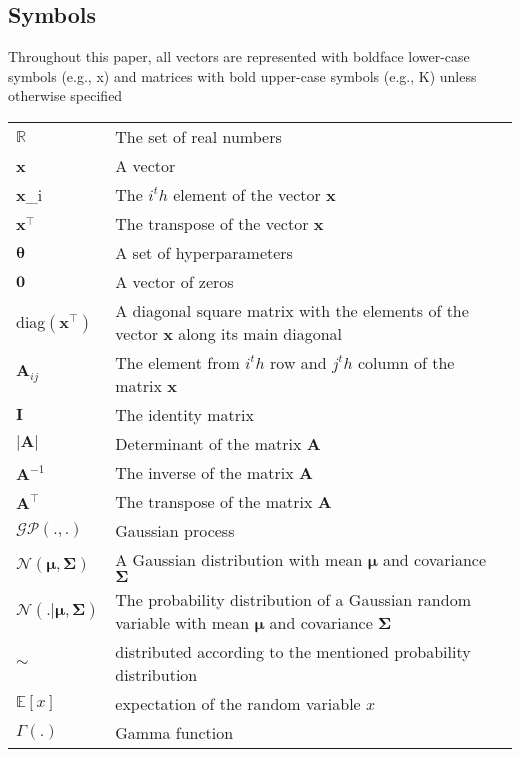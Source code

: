 \subsection{Symbols}
Throughout this paper, all vectors are represented with boldface lower-case symbols (e.g., x) and
matrices with bold upper-case symbols (e.g., K) unless otherwise specified %


\begin{table}[!htbp]
    {\renewcommand{\arraystretch}{1.5}
    \begin{tabularx}{0.99\textwidth}{ l| X }
      $\mathbb{R}$ & The set of real numbers \\
      \textbf{x} & A vector \\
      \textbf{x}_i & The $i^th$ element of the vector \textbf{x} \\
      $\textbf{x}^\top$ & The transpose of the vector \textbf{x} \\
      $\boldsymbol{\theta}$ & A set of hyperparameters \\
      $\textbf{0}$ & A vector of zeros \\
      diag$\left(\textbf{x}^\top\right)$ & A diagonal square matrix with the elements of the vector \textbf{x} along its main diagonal \\
      $\textbf{A}_{ij}$ & The element from $i^th$ row and $j^th$ column of the matrix \textbf{x} \\
      $\textbf{I}$ & The identity matrix \\ 
      $|\textbf{A}|$ & Determinant of the matrix \textbf{A} \\
      $\textbf{A}^{-1}$ & The inverse of the matrix \textbf{A} \\
      $\textbf{A}^\top$ & The transpose of the matrix \textbf{A} \\     
      $\mathcal{GP}\left(.,.\right)$ & Gaussian process \\
      $\mathcal{N}\left(\boldsymbol{\mu},\boldsymbol{\Sigma}\right)$ & A Gaussian distribution with mean $\boldsymbol{\mu}$ and covariance $\boldsymbol{\Sigma}$ \\
      $\mathcal{N}\left(.|\boldsymbol{\mu},\boldsymbol{\Sigma}\right)$ & The probability distribution of a Gaussian random variable with mean $\boldsymbol{\mu}$ and covariance $\boldsymbol{\Sigma}$ \\
      $\sim$ & distributed according to the mentioned probability distribution \\
      $\mathbb{E}\left[x\right]$ & expectation of the random variable $x$ \\
      $\Gamma\left(.\right)$ & Gamma function \\
    \end{tabularx}
    }
\end{table}


